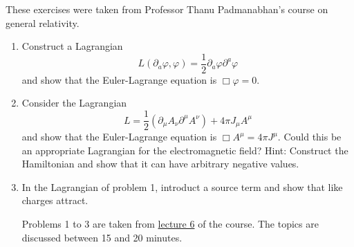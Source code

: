 \documentclass{article}
\begin{document}
These exercises were taken from Professor Thanu Padmanabhan's course on general
relativity.
\begin{enumerate}
\item Construct a Lagrangian
\[
L(\partial_a\varphi, \varphi) = \frac{1}{2}\partial_a\varphi\partial^a\varphi
\]
and show that the Euler-Lagrange equation is $\Box\varphi = 0$. 

\item Consider the Lagrangian
\[
L = \frac{1}{2}(\partial_\mu A_\nu \partial^\mu A^\nu) + 4\pi J_\mu A^\mu
\]
and show that the Euler-Lagrange equation is $\Box A^\mu = 4\pi J^\mu$. Could
this be an appropriate Lagrangian for the electromagnetic field?
Hint: Construct the Hamiltonian and show that it can have arbitrary negative 
values.

\item In the Lagrangian of problem 1, introduct a source term and show that
like charges attract.

Problems 1 to 3 are taken from \href{https://www.youtube.com/watch?v=dhgk6sMWGfM&list=PLfrsXbPUIUSB6xoXyIvVEHYiG-hVmJhHf&index=6}{lecture 6} 
of the course. The topics are discussed between 15 and 20 minutes.
\end{enumerate}
\end{document}
